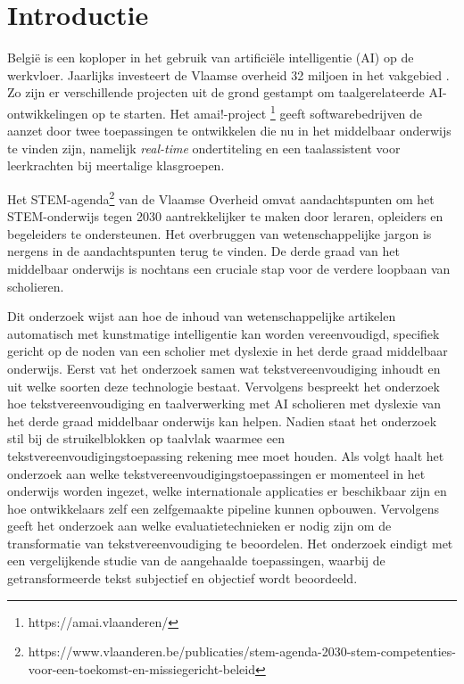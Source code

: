 
\section{Introductie}%
\label{sec:introductie}

België is een koploper in het gebruik van artificiële intelligentie (AI) op de werkvloer. Jaarlijks investeert de Vlaamse overheid 32 miljoen in het vakgebied \autocite{Crevits2022}. Zo zijn er verschillende projecten uit de grond gestampt om taalgerelateerde AI-ontwikkelingen op te starten. Het amai!-project \footnote{https://amai.vlaanderen/} geeft softwarebedrijven de aanzet door twee toepassingen te ontwikkelen die nu in het middelbaar onderwijs te vinden zijn, namelijk \textit{real-time} ondertiteling en een taalassistent voor leerkrachten bij meertalige klasgroepen.

Het STEM-agenda\footnote{https://www.vlaanderen.be/publicaties/stem-agenda-2030-stem-competenties-voor-een-toekomst-en-missiegericht-beleid}
van de Vlaamse Overheid omvat aandachtspunten om het STEM-onderwijs tegen 2030 aantrekkelijker te maken door leraren, opleiders en begeleiders te ondersteunen. Het overbruggen van wetenschappelijke jargon is nergens in de aandachtspunten terug te vinden. De derde graad van het middelbaar onderwijs is nochtans een cruciale stap voor de verdere loopbaan van scholieren. 

Dit onderzoek wijst aan hoe de inhoud van wetenschappelijke artikelen automatisch  met kunstmatige intelligentie kan worden vereenvoudigd, specifiek gericht op de noden van een scholier met dyslexie in het derde graad middelbaar onderwijs. Eerst vat het onderzoek samen wat tekstvereenvoudiging inhoudt en uit welke soorten deze technologie bestaat. Vervolgens bespreekt het onderzoek hoe tekstvereenvoudiging en taalverwerking met AI scholieren met dyslexie van het derde graad middelbaar onderwijs kan helpen. Nadien staat het onderzoek stil bij de struikelblokken op taalvlak waarmee een tekstvereenvoudigingstoepassing rekening mee moet houden. Als volgt haalt het onderzoek aan welke tekstvereenvoudigingstoepassingen er momenteel in het onderwijs worden ingezet, welke internationale applicaties er beschikbaar zijn en hoe ontwikkelaars zelf een zelfgemaakte pipeline kunnen opbouwen. Vervolgens geeft het onderzoek aan welke evaluatietechnieken er nodig zijn om de transformatie van tekstvereenvoudiging te beoordelen. Het onderzoek eindigt met een vergelijkende studie van de aangehaalde toepassingen, waarbij de getransformeerde tekst subjectief en objectief wordt beoordeeld.

